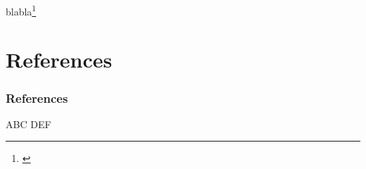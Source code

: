 \documentclass{beamer}
\begin{document}
\begin{frame} blabla\footnote{\cite{abc}} \end{frame}

\section{References}
\begin{frame}  
\frametitle{References}

\begin{thebibliography}{99} 
 ABC
 DEF   
\end{thebibliography}

\end{frame}
\end{document}
